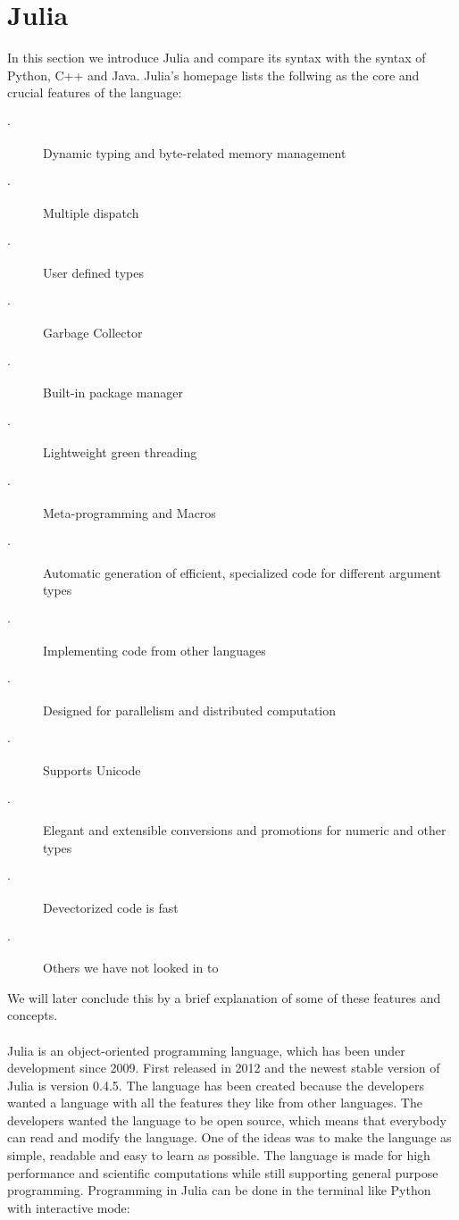 \documentclass[a4paper, 11pt, titlepage]{article}
\begin{document}
\section{Julia}
In this section we introduce Julia and compare its syntax with the syntax of Python, C++ and Java. Julia's homepage lists the follwing as the core and crucial features of the language:
\begin{description}
	\item[$\cdot$] Dynamic typing and byte-related memory management
	\item[$\cdot$] Multiple dispatch
	\item[$\cdot$] User defined types
	\item[$\cdot$] Garbage Collector
	\item[$\cdot$] Built-in package manager
	\item[$\cdot$] Lightweight green threading
	\item[$\cdot$] Meta-programming and Macros
	\item[$\cdot$] Automatic generation of efficient, specialized code for different argument types
	\item[$\cdot$] Implementing code from other languages
	\item[$\cdot$] Designed for parallelism and distributed computation
	\item[$\cdot$] Supports Unicode
	\item[$\cdot$] Elegant and extensible conversions and promotions for numeric and other types
	\item[$\cdot$] Devectorized code is fast
	\item[$\cdot$] Others we have not looked in to
\end{description}
We will later conclude this by a brief explanation of some of these features and concepts.\\
\\
Julia is an object-oriented programming language, which has been under development since 2009. First released in 2012 and the newest stable version of Julia is version 0.4.5. The language has been created because the developers wanted a language with all the features they like from other languages. The developers wanted the language to be open source, which means that everybody can read and modify the language. One of the ideas was to make the language as simple, readable and easy to learn as possible. The language is made for high performance and scientific computations while still supporting general purpose programming. 
Programming in Julia can be done in the terminal like Python with interactive mode:
\end{document}
